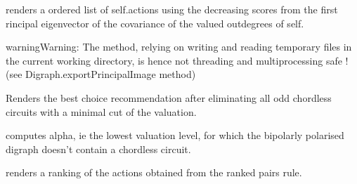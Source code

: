 \documentclass[letterpaper,10pt,english]{sphinxmanual}
\begin{document}
\begin{fulllineitems}
\begin{fulllineitems}
\end{fulllineitems}


\begin{fulllineitems}
\label{techDoc:digraphs.Digraph.computePrincipalOrder}
renders a ordered list of self.actions using the decreasing scores from the
first rincipal eigenvector of the covariance of the valued outdegrees of self.

\begin{notice}{warning}{Warning:}
The method, relying on writing and reading temporary files in the current
working directory, is hence not threading and multiprocessing safe !
(see Digraph.exportPrincipalImage method)
\end{notice}

\end{fulllineitems}


\begin{fulllineitems}
\label{techDoc:digraphs.Digraph.computePrudentBestChoiceRecommendation}
Renders the best choice recommendation after eliminating
all odd chordless circuits with a minimal cut of the valuation.

\end{fulllineitems}


\begin{fulllineitems}
\label{techDoc:digraphs.Digraph.computePrudentBetaLevel}
computes alpha, ie the lowest valuation level, for which the
bipolarly polarised digraph doesn't contain a chordless circuit.

\end{fulllineitems}


\begin{fulllineitems}
\label{techDoc:digraphs.Digraph.computeRankedPairsOrder}
renders a ranking of the actions obtained from the
ranked pairs rule.


\end{fulllineitems}
\end{fulllineitems}
\end{document}
